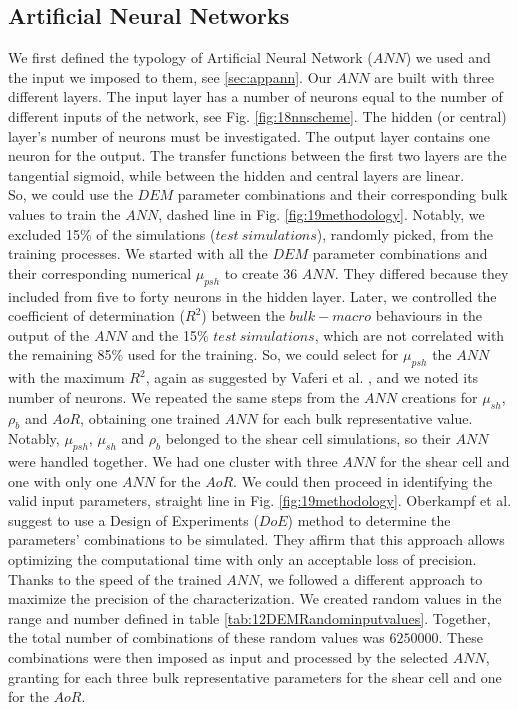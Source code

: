 \subsection{Artificial Neural Networks}
\label{subsec:ann}
We first defined the typology of Artificial Neural Network ($ANN$) we used and
the input we imposed to them, see \ref{sec:appann}.
Our $ANN$ are built with three different layers. 
The input layer has a number of neurons equal to the number of different inputs
of the network, see Fig. \ref{fig:18nnscheme}.
The hidden (or central) layer's number of neurons must be investigated. 
The output layer contains one neuron for the output.
The transfer functions between the first two layers are the tangential sigmoid, 
while between the hidden and central layers are linear.\\
So, we could use the $DEM$ parameter combinations and their corresponding bulk
values to train the $ANN$,
dashed line in Fig. \ref{fig:19methodology}.
Notably, we excluded 15\% of the simulations ($test ~ simulations$),
randomly picked, from the training processes.
We started with all the $DEM$ parameter combinations and their corresponding numerical $\mu_{psh}$ to create 36 $ANN$. 
They differed because they included from five to forty neurons in the hidden
layer.
Later, we controlled the coefficient of determination ($R^2$) between the
$bulk-macro$ behaviours in the output of the $ANN$ and the 15\% $test ~ simulations$, 
which are not correlated with the remaining 85\% used for the training. 
So, we could select for $\mu_{psh}$ the $ANN$ with the maximum $R^2$, 
again as suggested by Vaferi et al. \cite{RefWorks:150}, and we noted its number
of neurons.
We repeated the same steps from the $ANN$ creations for $\mu_{sh}$, $\rho_b$ and $AoR$, 
obtaining one trained $ANN$ for each bulk representative value. \\
Notably, $\mu_{psh}$, $\mu_{sh}$ and $\rho_b$ belonged to the shear cell
simulations, so their $ANN$ were handled together. 
We had one cluster with three $ANN$ for the shear cell and one with only one $ANN$
for the $AoR$.
We could then proceed in identifying the valid input parameters, straight line
in Fig. \ref{fig:19methodology}.
Oberkampf et al. \cite{RefWorks:160} suggest to use a Design of Experiments
($DoE$) method to determine the parameters' combinations to be simulated.
They affirm that this approach allows optimizing the computational time with
only an acceptable loss of precision.
Thanks to the speed of the trained $ANN$, we followed a different approach to
maximize the precision of the characterization.
We created random values
in the range and number defined in table \ref{tab:12DEMRandominputvalues}.
Together, the total number of combinations of these random values was $6250000$.
These combinations were then imposed as input and processed by the selected
$ANN$, granting for each three bulk representative parameters for the shear cell and one for the $AoR$. 



